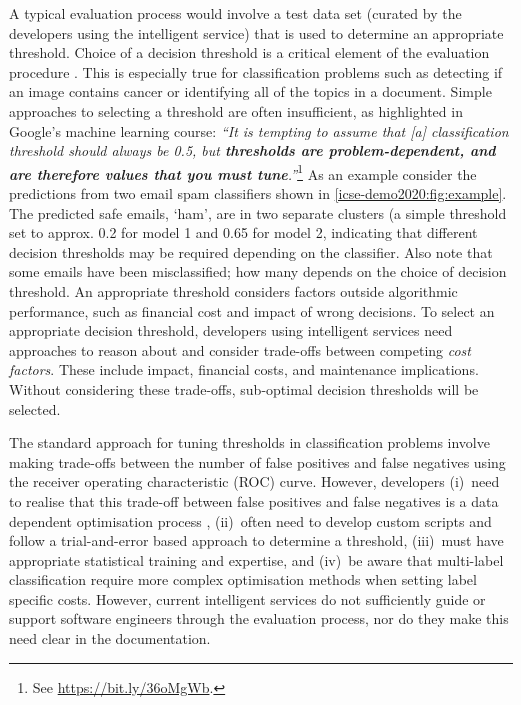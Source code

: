 A typical evaluation process would involve a test data set (curated by the developers using the intelligent service) that is used to determine an appropriate threshold. Choice of a decision threshold is a critical element of the evaluation procedure \citep{hardt2016equality}. This is especially true for classification problems such as detecting if an image contains cancer or identifying all of the topics in a document. Simple approaches to selecting a threshold are often insufficient, as highlighted in Google's machine learning course: \textit{``It is tempting to assume that [a] classification threshold should always be 0.5, but \textbf{thresholds are problem-dependent, and are therefore values that you must tune}.''}\footnote{See \url{https://bit.ly/36oMgWb}.} As an example consider the predictions from two email spam classifiers shown in \cref{icse-demo2020:fig:example}. The predicted safe emails, `ham', are in two separate clusters (a simple threshold set to approx. 0.2 for model 1 and 0.65 for model 2, indicating that different decision thresholds may be required depending on the classifier. Also note that some emails have been misclassified; how many depends on the choice of decision threshold. An appropriate threshold considers factors outside algorithmic performance, such as financial cost and impact of wrong decisions. To select an appropriate decision threshold, developers using intelligent services need approaches to reason about and consider trade-offs between competing \textit{cost factors}. These include impact, financial costs, and maintenance implications. Without considering these trade-offs, sub-optimal decision thresholds will be selected.   

The standard approach for tuning thresholds in classification problems involve making trade-offs between the number of false positives and false negatives using the receiver operating characteristic (ROC) curve. However, developers (i)~need to realise that this trade-off between false positives and false negatives is a data dependent optimisation process \citep{sculley2011detecting}, (ii)~often need to develop custom scripts and follow a trial-and-error based approach to determine a threshold, (iii)~must have appropriate statistical training and expertise, and (iv)~be aware that multi-label classification require more complex optimisation methods when setting label specific costs. However, current intelligent services do not sufficiently guide or support software engineers through the evaluation process, nor do they make this need clear in the documentation. 

